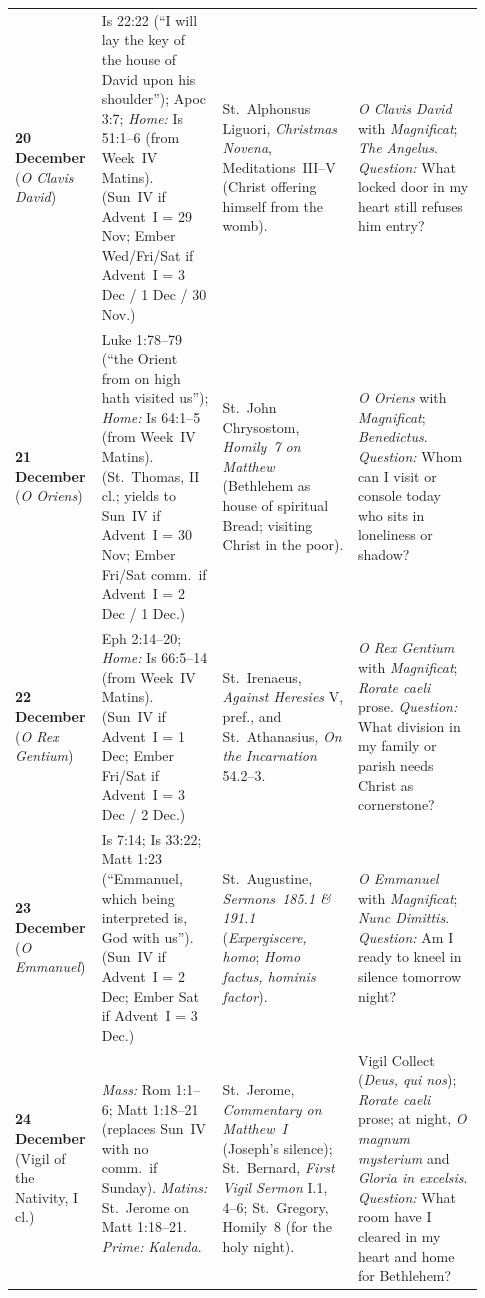 {\begin{longtable}{>{\raggedright\arraybackslash}p{0.14\linewidth}>{\raggedright\arraybackslash}p{0.25\linewidth}>{\raggedright\arraybackslash}p{0.28\linewidth}>{\raggedright\arraybackslash}p{0.26\linewidth}}
\textbf{20 December} (\textit{O Clavis David}) & Is 22:22 (``I will lay the key of the house of David upon his shoulder''); Apoc 3:7; \textit{Home:} Is 51:1--6 (from Week~IV Matins). (Sun~IV if Advent~I = 29 Nov; Ember Wed/Fri/Sat if Advent~I = 3 Dec / 1 Dec / 30 Nov.) & St.~Alphonsus Liguori, \textit{Christmas Novena}, Meditations~III--V (Christ offering himself from the womb). & \textit{O Clavis David} with \textit{Magnificat}; \textit{The Angelus}. \textit{Question:} What locked door in my heart still refuses him entry?\\
\textbf{21 December} (\textit{O Oriens}) & Luke 1:78--79 (``the Orient from on high hath visited us''); \textit{Home:} Is 64:1--5 (from Week~IV Matins). (St.~Thomas, II cl.; yields to Sun~IV if Advent~I = 30 Nov; Ember Fri/Sat comm.~if Advent~I = 2 Dec / 1 Dec.) & St.~John Chrysostom, \textit{Homily~7 on Matthew} (Bethlehem as house of spiritual Bread; visiting Christ in the poor). & \textit{O Oriens} with \textit{Magnificat}; \textit{Benedictus}. \textit{Question:} Whom can I visit or console today who sits in loneliness or shadow?\\
\textbf{22 December} (\textit{O Rex Gentium}) & Eph 2:14--20; \textit{Home:} Is 66:5--14 (from Week~IV Matins). (Sun~IV if Advent~I = 1 Dec; Ember Fri/Sat if Advent~I = 3 Dec / 2 Dec.) & St.~Irenaeus, \textit{Against Heresies} V, pref., and St.~Athanasius, \textit{On the Incarnation} 54.2--3. & \textit{O Rex Gentium} with \textit{Magnificat}; \textit{Rorate caeli} prose. \textit{Question:} What division in my family or parish needs Christ as cornerstone?\\
\textbf{23 December} (\textit{O Emmanuel}) & Is 7:14; Is 33:22; Matt 1:23 (``Emmanuel, which being interpreted is, God with us''). (Sun~IV if Advent~I = 2 Dec; Ember Sat if Advent~I = 3 Dec.) & St.~Augustine, \textit{Sermons~185.1 \& 191.1} (\textit{Expergiscere, homo}; \textit{Homo factus, hominis factor}). & \textit{O Emmanuel} with \textit{Magnificat}; \textit{Nunc Dimittis}. \textit{Question:} Am I ready to kneel in silence tomorrow night?\\
\textbf{24 December} (Vigil of the Nativity, I cl.) & \textit{Mass:} Rom 1:1--6; Matt 1:18--21 (replaces Sun~IV with no comm.~if Sunday). \textit{Matins:} St.~Jerome on Matt 1:18--21. \textit{Prime:} \textit{Kalenda}. & St.~Jerome, \textit{Commentary on Matthew~I} (Joseph's silence); St.~Bernard, \textit{First Vigil Sermon} I.1, 4--6; St.~Gregory, Homily~8 (for the holy night). & Vigil Collect (\textit{Deus, qui nos}); \textit{Rorate caeli} prose; at night, \textit{O magnum mysterium} and \textit{Gloria in excelsis}. \textit{Question:} What room have I cleared in my heart and home for Bethlehem?\\
\bottomrule
\end{longtable}
}
